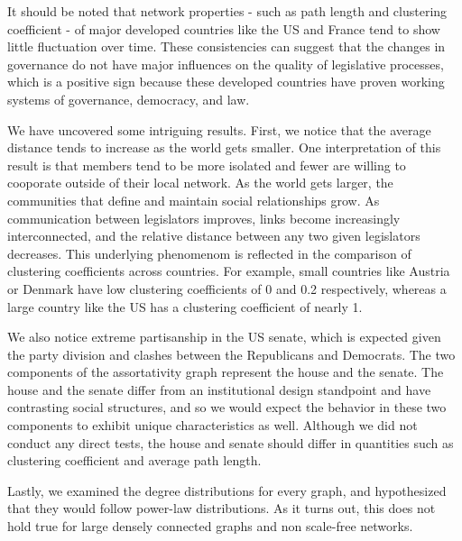 \documentclass[12pt]{article}
\begin{document}
\begin{multicols*}{2}
It should be noted that network properties - such as path length and clustering coefficient - of major developed countries like the US and France tend to show little fluctuation over time. These consistencies can suggest that the changes in governance do not have major influences on the quality of legislative processes, which is a positive sign because these developed countries have proven working systems of governance, democracy, and law. 

We have uncovered some intriguing results. First, we notice that the average distance tends to increase as the world gets smaller. One interpretation of this result is that members tend to be more isolated and fewer are willing to cooporate outside of their local network. As the world gets larger, the communities that define and maintain social relationships grow. As communication between legislators improves, links become increasingly interconnected, and the relative distance between any two given legislators decreases. This underlying phenomenom is reflected in the comparison of clustering coefficients across countries. For example, small countries like Austria or Denmark have low clustering coefficients of 0 and 0.2 respectively, whereas a large country like the US has a clustering coefficient of nearly 1. 

We also notice extreme partisanship in the US senate, which is expected given the party division and clashes between the Republicans and Democrats. The two components of the assortativity graph represent the house and the senate. The house and the senate differ from an institutional design standpoint and have contrasting social structures, and so we would expect the behavior in these two components to exhibit unique characteristics as well. Although we did not conduct any direct tests, the house and senate should differ in quantities such as clustering coefficient and average path length. 

Lastly, we examined the degree distributions for every graph, and hypothesized that they would follow power-law distributions. As it turns out, this does not hold true for large densely connected graphs and non scale-free networks.





\end{multicols*}
\end{document}
